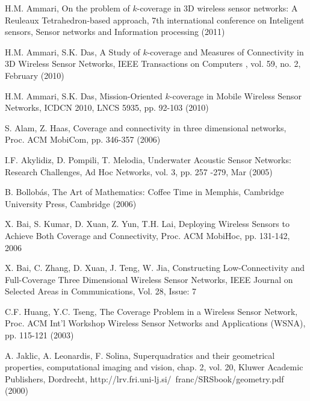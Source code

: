 \documentclass[conference]{IEEEtran}
\begin{document}


\begin{thebibliography}{99}


H.M. Ammari, On the problem of $k$-coverage in 3D wireless sensor networks: A Reuleaux Tetrahedron-based approach, 7th international conference on Inteligent sensors, Sensor networks and Information processing (2011)



H.M. Ammari, S.K. Das, A Study of $k$-coverage and Measures of Connectivity in 3D Wireless Sensor Networks, IEEE Transactions on Computers , vol. 59, no. 2, February (2010)



H.M. Ammari, S.K. Das, Mission-Oriented $k$-coverage in Mobile Wireless Sensor Networks, ICDCN 2010, LNCS 5935, pp. 92-103 (2010)


S. Alam, Z. Haas, Coverage and connectivity in three dimensional networks, Proc. ACM MobiCom, pp. 346-357 (2006)


I.F. Akylidiz, D. Pompili, T. Melodia, Underwater Acoustic Sensor Networks: Research Challenges, Ad Hoc Networks, vol. 3, pp. 257
-279, Mar (2005)


B. Bollobás, The Art of Mathematics: Coffee Time in Memphis, Cambridge University Press, Cambridge (2006)


X. Bai, S. Kumar, D. Xuan, Z. Yun, T.H. Lai, Deploying Wireless Sensors to Achieve Both Coverage and Connectivity, Proc. ACM MobiHoc, pp. 131-142, 2006


X. Bai, C. Zhang, D. Xuan, J. Teng, W. Jia, Constructing Low-Connectivity and Full-Coverage Three Dimensional Wireless Sensor Networks, IEEE Journal on Selected Areas in Communications, Vol. 28, Issue: 7  


C.F. Huang, Y.C. Tseng, The Coverage Problem in a Wireless Sensor Network, Proc. ACM Int’l Workshop Wireless Sensor Networks and Applications (WSNA), pp. 115-121 (2003)


A. Jaklic, A. Leonardis, F. Solina, Superquadratics and their geometrical properties, computational imaging and vision, chap. 2, vol. 20, Kluwer Academic Publishers, Dordrecht, http://lrv.fri.uni-lj.si/~franc/SRSbook/geometry.pdf (2000)


\end{thebibliography}
\end{document}
